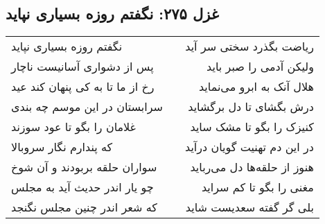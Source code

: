 \begin{center}
\section*{غزل ۲۷۵: نگفتم روزه بسیاری نپاید}
\label{sec:275}
\begin{longtable}{l p{0.5cm} r}
نگفتم روزه بسیاری نپاید
&&
ریاضت بگذرد سختی سر آید
\\
پس از دشواری آسانیست ناچار
&&
ولیکن آدمی را صبر باید
\\
رخ از ما تا به کی پنهان کند عید
&&
هلال آنک به ابرو می‌نماید
\\
سرابستان در این موسم چه بندی
&&
درش بگشای تا دل برگشاید
\\
غلامان را بگو تا عود سوزند
&&
کنیزک را بگو تا مشک ساید
\\
که پندارم نگار سروبالا
&&
در این دم تهنیت گویان درآید
\\
سواران حلقه بربودند و آن شوخ
&&
هنوز از حلقه‌ها دل می‌رباید
\\
چو یار اندر حدیث آید به مجلس
&&
مغنی را بگو تا کم سراید
\\
که شعر اندر چنین مجلس نگنجد
&&
بلی گر گفته سعدیست شاید
\\
\end{longtable}
\end{center}
